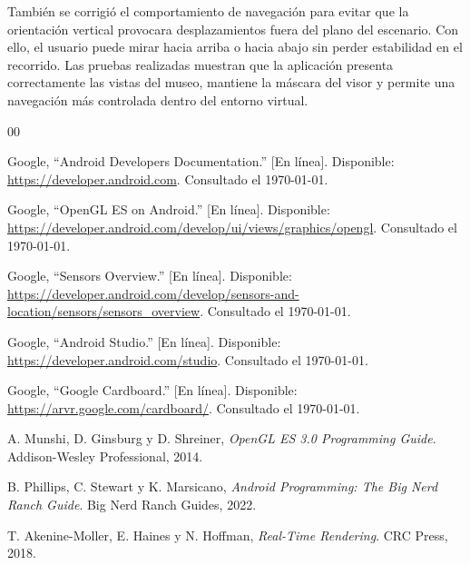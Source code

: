 \documentclass[conference]{IEEEtran}
\begin{document}
También se corrigió el comportamiento de navegación para evitar que la orientación vertical provocara desplazamientos fuera del plano del escenario. Con ello, el usuario puede mirar hacia arriba o hacia abajo sin perder estabilidad en el recorrido. Las pruebas realizadas muestran que la aplicación presenta correctamente las vistas del museo, mantiene la máscara del visor y permite una navegación más controlada dentro del entorno virtual.

\begin{thebibliography}{00}

 Google, ``Android Developers Documentation.'' [En línea]. Disponible: \url{https://developer.android.com}. Consultado el \specialdate\today.

 Google, ``OpenGL ES on Android.'' [En línea]. Disponible: \url{https://developer.android.com/develop/ui/views/graphics/opengl}. Consultado el \specialdate\today.

 Google, ``Sensors Overview.'' [En línea]. Disponible: \url{https://developer.android.com/develop/sensors-and-location/sensors/sensors_overview}. Consultado el \specialdate\today.

 Google, ``Android Studio.'' [En línea]. Disponible: \url{https://developer.android.com/studio}. Consultado el \specialdate\today.

 Google, ``Google Cardboard.'' [En línea]. Disponible: \url{https://arvr.google.com/cardboard/}. Consultado el \specialdate\today.

 A. Munshi, D. Ginsburg y D. Shreiner, \textit{OpenGL ES 3.0 Programming Guide}. Addison-Wesley Professional, 2014.

 B. Phillips, C. Stewart y K. Marsicano, \textit{Android Programming: The Big Nerd Ranch Guide}. Big Nerd Ranch Guides, 2022.

 T. Akenine-Moller, E. Haines y N. Hoffman, \textit{Real-Time Rendering}. CRC Press, 2018.

\end{thebibliography}
\end{document}

